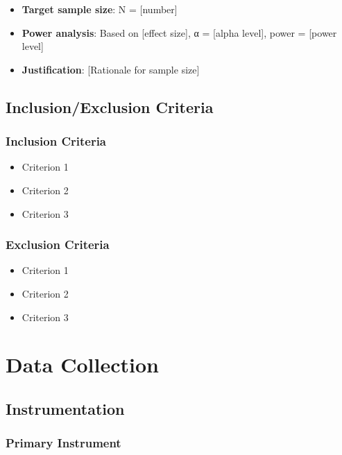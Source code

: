 \documentclass[
  12pt,
  letterpaper,
  12pt,
  letterpaper,
  oneside]{report}
\providecommand{\tightlist}{%
  \setlength{\itemsep}{0pt}\setlength{\parskip}{0pt}}
\begin{document}
\begin{itemize}
\tightlist
\item
  \textbf{Target sample size}: N = {[}number{]}
\item
  \textbf{Power analysis}: Based on {[}effect size{]}, α = {[}alpha
  level{]}, power = {[}power level{]}
\item
  \textbf{Justification}: {[}Rationale for sample size{]}
\end{itemize}

\subsection{Inclusion/Exclusion
Criteria}\label{inclusionexclusion-criteria}

\subsubsection{Inclusion Criteria}\label{inclusion-criteria}

\begin{itemize}
\tightlist
\item
  Criterion 1
\item
  Criterion 2
\item
  Criterion 3
\end{itemize}

\subsubsection{Exclusion Criteria}\label{exclusion-criteria}

\begin{itemize}
\tightlist
\item
  Criterion 1
\item
  Criterion 2
\item
  Criterion 3
\end{itemize}

\section{Data Collection}\label{data-collection}

\subsection{Instrumentation}\label{instrumentation}

\subsubsection{Primary Instrument}\label{primary-instrument}
\end{document}
